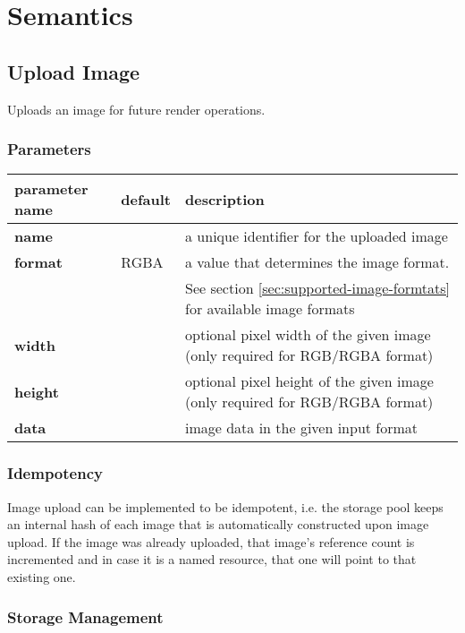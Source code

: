 \documentclass[a4paper]{article}
\begin{document}
\section{Semantics} %

\subsection{Upload Image}

Uploads an image for future render operations.

\subsubsection*{Parameters}

\begin{tabular}{|l|l|l|}
  \hline
  \textbf{parameter name} & \textbf{default} & \textbf{description} \\
  \hline
  \textbf{name}           &                  & a unique identifier for the uploaded image \\
  \textbf{format}         & RGBA             & a value that determines the image format. \\
                          &                  & See section \ref{sec:supported-image-formtats} for available image formats \\
  \textbf{width}          &                  & optional pixel width of the given image (only required for RGB/RGBA format) \\
  \textbf{height}         &                  & optional pixel height of the given image (only required for RGB/RGBA format) \\
  \textbf{data}           &                  & image data in the given input format \\
  \hline
\end{tabular}

\subsubsection{Idempotency}

Image upload can be implemented to be idempotent, i.e. the storage pool keeps an internal hash
of each image that is automatically constructed upon image upload.
If the image was already uploaded, that image's reference count is incremented
and in case it is a named resource, that one will point to that existing one.

\subsubsection{Storage Management}
\end{document}
